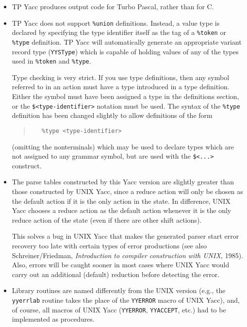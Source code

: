 \begin{itemize}
   \item
      TP Yacc produces output code for Turbo Pascal, rather than for C.
   \item
      TP Yacc does not support \verb"%union" definitions. Instead, a value
      type is declared by specifying the type identifier itself as the tag of
      a \verb"%token" or \verb"%type" definition. TP Yacc will automatically
      generate an appropriate variant record type (\verb"YYSType") which is
      capable of holding values of any of the types used in \verb"%token" and
      \verb"%type".

      Type checking is very strict. If you use type definitions, then
      any symbol referred to in an action must have a type introduced
      in a type definition. Either the symbol must have been assigned a
      type in the definitions section, or the \verb"$<type-identifier>"
      notation must be used. The syntax of the \verb"%type" definition has
      been changed slightly to allow definitions of the form
      \begin{quote}\begin{verbatim}
   %type <type-identifier>
      \end{verbatim}\end{quote}
      (omitting the nonterminals) which may be used to declare types which
      are not assigned to any grammar symbol, but are used with the
      \verb"$<...>" construct.
   \item
      The parse tables constructed by this Yacc version are slightly greater
      than those constructed by UNIX Yacc, since a reduce action will only be
      chosen as the default action if it is the only action in the state.
      In difference, UNIX Yacc chooses a reduce action as the default action
      whenever it is the only reduce action of the state (even if there are
      other shift actions).

      This solves a bug in UNIX Yacc that makes the generated parser start
      error recovery too late with certain types of error productions (see
      also Schreiner/Friedman, {\em Introduction to compiler construction with
      UNIX,\/} 1985). Also, errors will be caught sooner in most cases where
      UNIX Yacc would carry out an additional (default) reduction before
      detecting the error.
   \item
      Library routines are named differently from the UNIX version (e.g.,
      the \verb"yyerrlab" routine takes the place of the \verb"YYERROR"
      macro of UNIX Yacc), and, of course, all macros of UNIX Yacc
      (\verb"YYERROR", \verb"YYACCEPT", etc.) had to be implemented as
      procedures.
\end{itemize}


